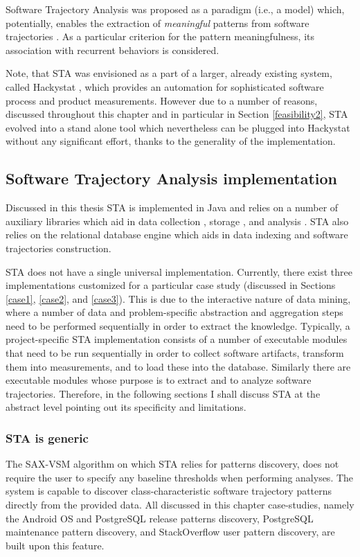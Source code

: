 Software Trajectory Analysis was proposed as a paradigm (i.e., a model) which, potentially, enables the extraction of \textit{meaningful} patterns from software trajectories \cite{citeulike:13159603}. As a particular criterion for the pattern meaningfulness, its association with recurrent behaviors is considered. 

Note, that STA was envisioned as a part of a larger, already existing system, called Hackystat \cite{citeulike:557296}, which provides an automation for sophisticated software process and product measurements. However due to a number of reasons, discussed throughout this chapter and in particular in Section \ref{feasibility2}, STA evolved into a stand alone tool which nevertheless can be plugged into Hackystat without any significant effort, thanks to the generality of the implementation.

\subsection{Software Trajectory Analysis implementation}
Discussed in this thesis STA is implemented in Java and relies on a number of auxiliary libraries which aid in data collection \cite{jgit}, storage \cite{mybatis}, and analysis \cite{sax-vsm}. STA also relies on the relational database engine which aids in data indexing and software trajectories construction. 

STA does not have a single universal implementation. Currently, there exist three implementations customized for a particular case study (discussed in Sections \ref{case1}, \ref{case2}, and \ref{case3}). This is due to the interactive nature of data mining, where a number of data and problem-specific abstraction and aggregation steps need to be performed sequentially in order to extract the knowledge. Typically, a project-specific STA implementation consists of a number of executable modules that need to be run sequentially in order to collect software artifacts, transform them into measurements, and to load these into the database. Similarly there are executable modules whose purpose is to extract and to analyze software trajectories. Therefore, in the following sections I shall discuss STA at the abstract level pointing out its specificity and limitations.

\subsubsection{STA is generic}
The \mbox{SAX-VSM} algorithm on which STA relies for patterns discovery, does not require the user to specify any baseline thresholds when performing analyses. The system is capable to discover class-characteristic software trajectory patterns directly from the provided data. All discussed in this chapter case-studies, namely the Android OS and PostgreSQL release patterns discovery,  PostgreSQL maintenance pattern discovery, and StackOverflow user pattern discovery, are built upon this feature.

